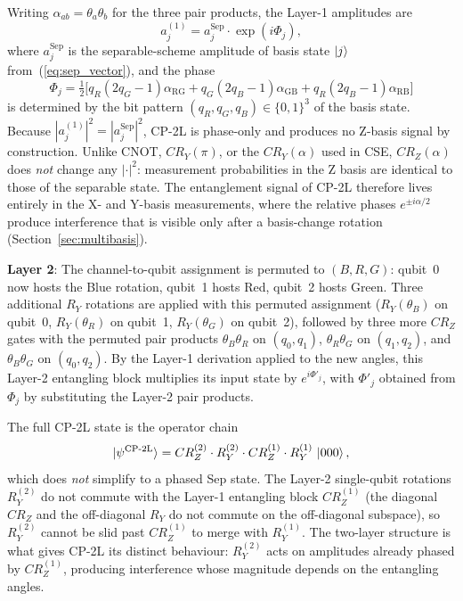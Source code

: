 \documentclass[conference,compsoc]{IEEEtran}
\begin{document}
Writing $\alpha_{ab} = \theta_a \theta_b$ for the three pair products, the Layer-1 amplitudes are
\begin{equation}
    a^{(1)}_j = a^\text{Sep}_j \cdot \exp(i\Phi_j),
    \label{eq:cp2l_amps}
\end{equation}
where $a^\text{Sep}_j$ is the separable-scheme amplitude of basis state $\ket{j}$ from~(\ref{eq:sep_vector}), and the phase
\begin{equation}
    \Phi_j = \tfrac{1}{2}\bigl[q_R(2q_G-1)\alpha_\text{RG} + q_G(2q_B-1)\alpha_\text{GB} + q_R(2q_B-1)\alpha_\text{RB}\bigr]
\end{equation}
is determined by the bit pattern $(q_R, q_G, q_B) \in \{0,1\}^3$ of the basis state.
Because $|a^{(1)}_j|^2 = |a^\text{Sep}_j|^2$, CP-2L is phase-only and produces no Z-basis signal by construction. Unlike CNOT, $CR_Y(\pi)$, or the $CR_Y(\alpha)$ used in CSE, $CR_Z(\alpha)$ does \emph{not} change any $|\cdot|^2$: measurement probabilities in the Z basis are identical to those of the separable state.
The entanglement signal of CP-2L therefore lives entirely in the X- and Y-basis measurements, where the relative phases $e^{\pm i\alpha/2}$ produce interference that is visible only after a basis-change rotation (Section~\ref{sec:multibasis}).

\textbf{Layer 2}: The channel-to-qubit assignment is permuted to $(B,R,G)$: qubit~0 now hosts the Blue rotation, qubit~1 hosts Red, qubit~2 hosts Green. Three additional $R_Y$ rotations are applied with this permuted assignment ($R_Y(\theta_B)$ on qubit~0, $R_Y(\theta_R)$ on qubit~1, $R_Y(\theta_G)$ on qubit~2), followed by three more $CR_Z$ gates with the permuted pair products $\theta_B\theta_R$ on $(q_0,q_1)$, $\theta_R\theta_G$ on $(q_1,q_2)$, and $\theta_B\theta_G$ on $(q_0,q_2)$. By the Layer-1 derivation applied to the new angles, this Layer-2 entangling block multiplies its input state by $e^{i\Phi'_j}$, with $\Phi'_j$ obtained from $\Phi_j$ by substituting the Layer-2 pair products.

The full CP-2L state is the operator chain
\begin{equation}
    \ket{\psi^\text{CP-2L}} = CR_Z^{(2)} \cdot R_Y^{(2)} \cdot CR_Z^{(1)} \cdot R_Y^{(1)} \, \ket{000},
    \label{eq:cp2l_chain}
\end{equation}
which does \emph{not} simplify to a phased Sep state. The Layer-2 single-qubit rotations $R_Y^{(2)}$ do not commute with the Layer-1 entangling block $CR_Z^{(1)}$ (the diagonal $CR_Z$ and the off-diagonal $R_Y$ do not commute on the off-diagonal subspace), so $R_Y^{(2)}$ cannot be slid past $CR_Z^{(1)}$ to merge with $R_Y^{(1)}$. The two-layer structure is what gives CP-2L its distinct behaviour: $R_Y^{(2)}$ acts on amplitudes already phased by $CR_Z^{(1)}$, producing interference whose magnitude depends on the entangling angles.
\end{document}
